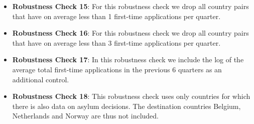 \documentclass[11pt,a4paper]{scrartcl}
\begin{document}
\begin{itemize}
	\item \textbf{Robustness Check 15}: For this robustness check we drop all country pairs that have on average less than 1 first-time applications per quarter. 
	
	\item \textbf{Robustness Check 16}: For this robustness check we drop all country pairs that have on average less than 3 first-time applications per quarter. 
	
	\item \textbf{Robustness Check 17}: In this robustness check we include the log of the average total first-time applications in the previous 6 quarters as an additional control.  
	 	
	\item \textbf{Robustness Check 18}: This robustness check uses only countries for which there is also data on asylum decisions. The destination countries Belgium, Netherlands and Norway are thus not included.
	
\end{itemize}
\end{document}
